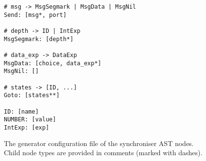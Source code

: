 \begin{figure}
\begin{lstlisting}[frame=single]
# msg -> MsgSegmark | MsgData | MsgNil
Send: [msg*, port]

# depth -> ID | IntExp
MsgSegmark: [depth*]

# data_exp -> DataExp
MsgData: [choice, data_exp*]
MsgNil: []

# states -> [ID, ...]
Goto: [states**]

ID: [name]
NUMBER: [value]
IntExp: [exp]

\end{lstlisting}
\caption{The generator configuration file of the synchroniser AST nodes. Child node types are provided in comments (marked with dashes).}
\label{ast_struc}
\end{figure}

